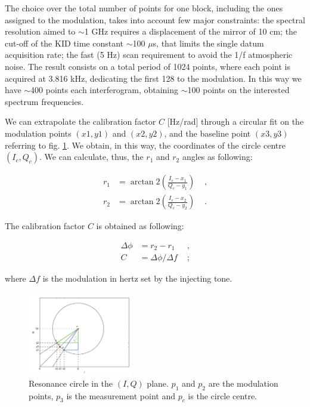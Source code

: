 \documentclass[twocolumn,traditabstract]{aa}\\
\begin{document}
\noindent The choice over the total number of points for one block, including the ones assigned to the modulation, takes into account few major constraints: the spectral resolution aimed to $\sim$1 GHz requires a displacement of the mirror of 10 cm; the cut-off of the KID time constant $\sim$100 $\mu$s, that limits the single datum acquisition rate; the fast (5 Hz) scan requirement to avoid the 1/f atmospheric noise. The result consists on a total period of 1024 points, where each point is acquired at 3.816 kHz, dedicating the first 128 to the modulation. In this way we have $\sim$400 points each interferogram, obtaining $\sim$100 points on the interested spectrum frequencies.

\noindent We can extrapolate the calibration factor $C$ [Hz/rad] through a circular fit on the modulation points $(x1,y1)$ and $(x2,y2)$, and the baseline point $(x3,y3)$ referring to fig. \ref{fig:IQ_modulation}. We obtain, in this way, the coordinates of the circle centre $(I_c,Q_c)$. We can calculate, thus, the $r_1$ and $r_2$ angles as following:

\begin{equation}
\begin{align}
r_1 &= \arctan2\left( \frac{I_c-x_1}{Q_c - y_1}  \right) &\text{ ,}\\
r_2 &= \arctan2\left( \frac{I_c-x_2}{Q_c - y_2}  \right) &\text{ .}
\end{align}
\end{equation}

\noindent The calibration factor $C$ is obtained as following:

\begin{equation}
\begin{align}
\Delta \phi &= r_2-r_1 &\text{ ,}\\
C&=\Delta\phi/\Delta f &\text{ ;}
\end{align}
\end{equation}

\noindent where $\Delta f$ is the modulation in hertz set by the injecting tone. 

\begin{figure}[htf]
	\centering
	\includegraphics[width=0.4\textwidth]{3.acqui/circle.png}
	\caption{Resonance circle in the $(I,Q)$ plane. $p_1$ and $p_2$ are the modulation points, $p_3$ is the measurement point and $p_c$ is the circle centre. }
	\label{fig:IQ_modulation}
\end{figure}
\end{document}
